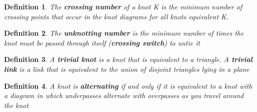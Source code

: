 \documentclass[executivepaper]{article}
\newtheorem{definition}{Definition}
\begin{document}
\vspace{2mm}

\begin{tcolorbox}

\begin{definition}

\textit{The \textbf{crossing number} of a knot K is the minimum number of crossing points that occur in the knot diagrams for all knots equivalent K.}

\end{definition}

\end{tcolorbox}

\vspace{2mm}

\begin{tcolorbox}

\begin{definition}

\textit{The \textbf{unknotting number} is the minimum number of times the knot must be passed through itself (\textbf{crossing switch}) to untie it}

\end{definition}

\end{tcolorbox}

\vspace{2mm}

\begin{tcolorbox}

\begin{definition}

\textit{A \textbf{trivial knot} is a knot that is equivalent to a triangle. A \textbf{trivial link} is a link that is equivalent to the union of disjoint triangles lying in a plane}

\end{definition}

\end{tcolorbox}

\vspace{2mm}

\begin{tcolorbox}

\begin{definition}

\textit{A knot is \textbf{alternating} if and only if it is equivalent to a knot with a diagram in which underpasses alternate with overpasses as you travel around the knot}

\end{definition}

\end{tcolorbox}
\end{document}
